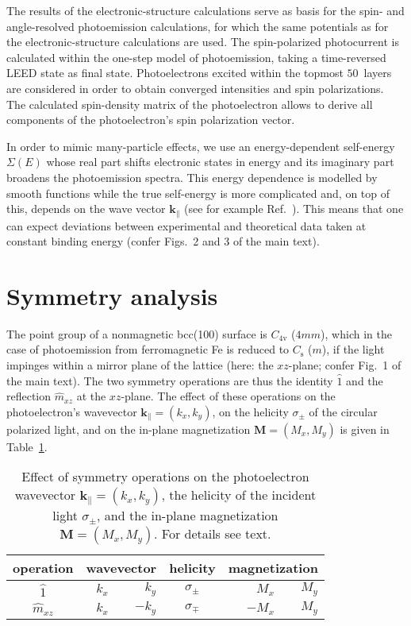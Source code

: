 \documentclass[amsfonts, amssymb, amsmath, preprint, showkeys, twoside, prl, superscriptaddress, aps]{revtex4-2}
\renewcommand{\vec}[1]{\boldsymbol{#1}}
\begin{document}
\begin{sloppy}
The results of the electronic-structure calculations serve as basis for the spin- and angle-resolved photoemission calculations, for which the same potentials as for the electronic-structure calculations are used. The spin-polarized photocurrent is calculated within the one-step model of photoemission, taking a time-reversed LEED state as final state. Photoelectrons excited within the topmost $50$~layers are considered in order to obtain converged intensities and spin polarizations. The calculated spin-density matrix of the photoelectron allows to derive all components of the photoelectron's spin polarization vector. 

In order to mimic many-particle effects, we use an energy-dependent self-energy $\Sigma(E)$ whose real part shifts electronic states in energy and its imaginary part broadens the photoemission spectra. This energy dependence is modelled by smooth functions while the true self-energy is more complicated and, on top of this, depends on the wave vector $\vec{k}_{\parallel}$ (see for example Ref.~). This means that one can expect deviations between experimental and theoretical data taken at constant binding energy (confer Figs.~2 and 3 of the main text).

\section{Symmetry analysis}
The point group of a nonmagnetic bcc(100) surface is $C_{4\mathrm{v}}$ ($4mm$), which in the case of photoemission from ferromagnetic Fe is reduced to $C_{\mathrm{s}}$ ($m$), if the light impinges within a mirror plane of the lattice (here: the $xz$-plane; confer Fig.~1 of the main text). The two symmetry operations are thus the identity $\hat{1}$ and the reflection $\hat{m}_{xz}$ at the $xz$-plane. The effect of these operations on the photoelectron's wavevector $\vec{k}_{\parallel} = (k_{x}, k_{y})$, on the helicity $\sigma_{\pm}$ of the circular polarized light, and on the in-plane magnetization $\vec{M} = (M_{x}, M_{y})$ is given in Table~\ref{tab:symmetry}.

\begin{table}
    \centering
    \caption{Effect of symmetry operations on the photoelectron wavevector $\vec{k}_{\parallel} = (k_{x}, k_{y})$, the helicity of the incident light $\sigma_{\pm}$, and the in-plane magnetization $\vec{M} = (M_{x}, M_{y})$. For details see text.}
    \label{tab:symmetry}
    \begin{tabular}{c|rrcrr}
     \hline \hline
        \multicolumn{1}{c|}{operation} & 
        \multicolumn{2}{c}{wavevector} & 
        \multicolumn{1}{c}{helicity} &  
        \multicolumn{2}{c}{magnetization} \\ \hline
        $\hat{1}$      & $k_{x}$ & $k_{y}$  & $\sigma_{\pm}$ & $M_{x}$ & $M_{y}$ \\
        $\hat{m}_{xz}$ & $k_{x}$ & $-k_{y}$ & $\sigma_{\mp}$ &  $-M_{x}$ & $M_{y}$ \\
     \hline \hline
    \end{tabular}
\end{table}


\end{sloppy}
\end{document}
